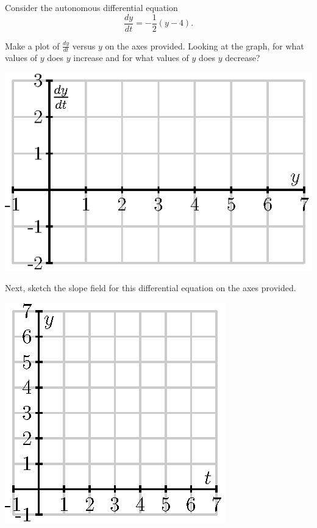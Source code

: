 \begin{activity} \label{A:6.6.4}  
  Consider the autonomous differential equation 
$$
\frac{dy}{dt} = -\frac 12( y - 4).
$$

\ba
\item Make a plot of $\frac{dy}{dt}$ versus $y$ on the axes provided.  Looking at the
  graph, for what values of $y$ does $y$ increase and for what values of $y$
  does $y$ decrease?

  \begin{center}
    \includegraphics{figures/7_2_Act1_1.eps}
  \end{center}

\item Next, sketch the slope field for this differential equation on the axes provided.

  \begin{center}
    \includegraphics{figures/7_2_Act1_2.eps}
  \end{center}


\end{activity}
